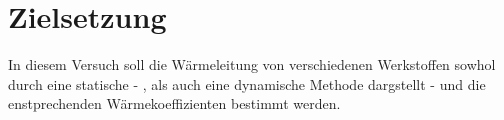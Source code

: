 \section{Zielsetzung}
In diesem Versuch soll die Wärmeleitung von verschiedenen Werkstoffen sowhol durch 
eine statische - , als auch eine dynamische Methode dargstellt - und die enstprechenden Wärmekoeffizienten bestimmt werden.